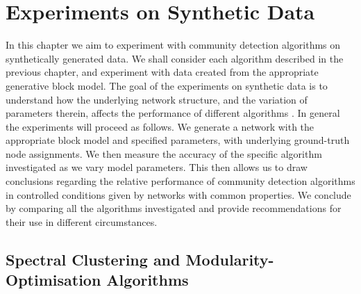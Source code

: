 
\chapter{Experiments on Synthetic Data}

\label{cha:experimentsOnSyntheticData}


In this chapter we aim to experiment with community detection algorithms on synthetically generated data.
We shall consider each algorithm described in the previous chapter, and experiment with data created from the appropriate generative block model.
The goal of the experiments on synthetic data is to understand how the underlying
network structure, and the variation of parameters therein, affects the performance of different algorithms \cite{RLK12}.
In general the experiments will proceed as follows.
We generate a network with the appropriate block model and specified parameters, with underlying ground-truth node assignments.
We then measure the accuracy of the specific algorithm investigated as we vary model parameters.
This then allows us to draw conclusions regarding the relative performance of community detection algorithms in controlled conditions given by networks with common properties.
We conclude by comparing all the algorithms investigated and provide recommendations for their use in different circumstances.


\section{Spectral Clustering and Modularity-Optimisation Algorithms}
\label{sec:spectralClusteringModularityOptimisationAlgorithms}

